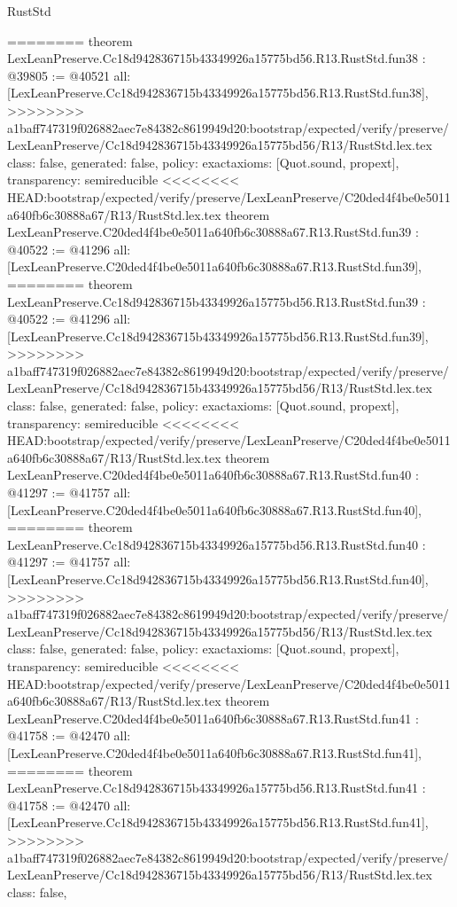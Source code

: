 \begin{lexlean}{RustStd}
\begin{coremodule}
{\begin{coremodule}
{{{{{{{{{{{{{{{{{{{{{{{{{{{{{{{{{{{{{{{{{========
theorem LexLeanPreserve.Cc18d942836715b43349926a15775bd56.R13.RustStd.fun38 : @39805 := @40521 {
  all: [LexLeanPreserve.Cc18d942836715b43349926a15775bd56.R13.RustStd.fun38],
>>>>>>>> a1baff747319f026882aec7e84382c8619949d20:bootstrap/expected/verify/preserve/LexLeanPreserve/Cc18d942836715b43349926a15775bd56/R13/RustStd.lex.tex
  class: false,
  generated: false,
  policy: exact{axioms: [Quot.sound, propext]},
  transparency: semireducible
}
<<<<<<<< HEAD:bootstrap/expected/verify/preserve/LexLeanPreserve/C20ded4f4be0e5011a640fb6c30888a67/R13/RustStd.lex.tex
theorem LexLeanPreserve.C20ded4f4be0e5011a640fb6c30888a67.R13.RustStd.fun39 : @40522 := @41296 {
  all: [LexLeanPreserve.C20ded4f4be0e5011a640fb6c30888a67.R13.RustStd.fun39],
========
theorem LexLeanPreserve.Cc18d942836715b43349926a15775bd56.R13.RustStd.fun39 : @40522 := @41296 {
  all: [LexLeanPreserve.Cc18d942836715b43349926a15775bd56.R13.RustStd.fun39],
>>>>>>>> a1baff747319f026882aec7e84382c8619949d20:bootstrap/expected/verify/preserve/LexLeanPreserve/Cc18d942836715b43349926a15775bd56/R13/RustStd.lex.tex
  class: false,
  generated: false,
  policy: exact{axioms: [Quot.sound, propext]},
  transparency: semireducible
}
<<<<<<<< HEAD:bootstrap/expected/verify/preserve/LexLeanPreserve/C20ded4f4be0e5011a640fb6c30888a67/R13/RustStd.lex.tex
theorem LexLeanPreserve.C20ded4f4be0e5011a640fb6c30888a67.R13.RustStd.fun40 : @41297 := @41757 {
  all: [LexLeanPreserve.C20ded4f4be0e5011a640fb6c30888a67.R13.RustStd.fun40],
========
theorem LexLeanPreserve.Cc18d942836715b43349926a15775bd56.R13.RustStd.fun40 : @41297 := @41757 {
  all: [LexLeanPreserve.Cc18d942836715b43349926a15775bd56.R13.RustStd.fun40],
>>>>>>>> a1baff747319f026882aec7e84382c8619949d20:bootstrap/expected/verify/preserve/LexLeanPreserve/Cc18d942836715b43349926a15775bd56/R13/RustStd.lex.tex
  class: false,
  generated: false,
  policy: exact{axioms: [Quot.sound, propext]},
  transparency: semireducible
}
<<<<<<<< HEAD:bootstrap/expected/verify/preserve/LexLeanPreserve/C20ded4f4be0e5011a640fb6c30888a67/R13/RustStd.lex.tex
theorem LexLeanPreserve.C20ded4f4be0e5011a640fb6c30888a67.R13.RustStd.fun41 : @41758 := @42470 {
  all: [LexLeanPreserve.C20ded4f4be0e5011a640fb6c30888a67.R13.RustStd.fun41],
========
theorem LexLeanPreserve.Cc18d942836715b43349926a15775bd56.R13.RustStd.fun41 : @41758 := @42470 {
  all: [LexLeanPreserve.Cc18d942836715b43349926a15775bd56.R13.RustStd.fun41],
>>>>>>>> a1baff747319f026882aec7e84382c8619949d20:bootstrap/expected/verify/preserve/LexLeanPreserve/Cc18d942836715b43349926a15775bd56/R13/RustStd.lex.tex
  class: false,
}}}}}}}}}}}}}}}}}}}}}}}}}}}}}}}}}}}}}}}}}}}}}
\end{coremodule}}
\end{coremodule}
\end{lexlean}
